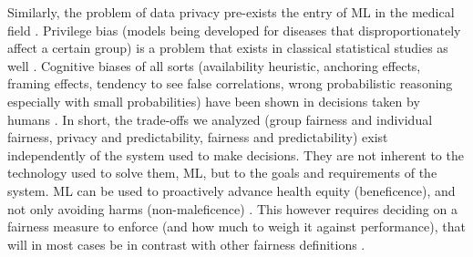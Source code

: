     Similarly, the problem of data privacy pre-exists the entry of ML in the medical field \cite{Dijkstra2020}.
    Privilege bias (models being developed for diseases that disproportionately affect a certain group) \cite{Rajkomar2018} is a problem that exists in classical statistical studies as well \cite{Jackson2019}.
    Cognitive biases of all sorts (availability heuristic, anchoring effects, framing effects, tendency to see false correlations, wrong probabilistic reasoning especially with small probabilities) have been shown in decisions taken by humans \cite{Zerilli2019}.
    In short, the trade-offs we analyzed (group fairness and individual fairness, privacy and predictability, fairness and predictability) exist independently of the system used to make decisions.
    They are not inherent to the technology used to solve them, ML, but to the goals and requirements of the system.
    ML can be used to proactively advance health equity (beneficence), and not only avoiding harms (non-maleficence) \cite{Rajkomar2018}\cite{Mccradden2020}.
    This however requires deciding on a fairness measure to enforce (and how much to weigh it against performance), that will in most cases be in contrast with other fairness definitions \cite{Zerilli2019}.



